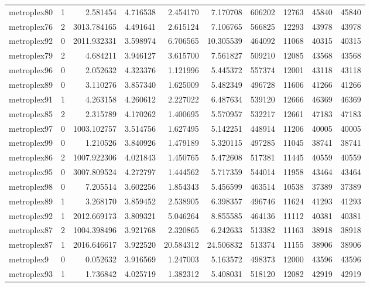 \begin{longtable}{|l|r|r|r|r|r|r|r|r|r|}
metroplex80 & 1 & 2.581454 & 4.716538 & 2.454170 & 7.170708 & 606202 & 12763 & 45840 & 45840 \\
metroplex76 & 2 & 3013.784165 & 4.491641 & 2.615124 & 7.106765 & 566825 & 12293 & 43978 & 43978 \\
metroplex92 & 0 & 2011.932331 & 3.598974 & 6.706565 & 10.305539 & 464092 & 11068 & 40315 & 40315 \\
metroplex79 & 2 & 4.684211 & 3.946127 & 3.615700 & 7.561827 & 509210 & 12085 & 43568 & 43568 \\
metroplex96 & 0 & 2.052632 & 4.323376 & 1.121996 & 5.445372 & 557374 & 12001 & 43118 & 43118 \\
metroplex89 & 0 & 3.110276 & 3.857340 & 1.625009 & 5.482349 & 496728 & 11606 & 41266 & 41266 \\
metroplex91 & 1 & 4.263158 & 4.260612 & 2.227022 & 6.487634 & 539120 & 12666 & 46369 & 46369 \\
metroplex85 & 2 & 2.315789 & 4.170262 & 1.400695 & 5.570957 & 532217 & 12661 & 47183 & 47183 \\
metroplex97 & 0 & 1003.102757 & 3.514756 & 1.627495 & 5.142251 & 448914 & 11206 & 40005 & 40005 \\
metroplex99 & 0 & 1.210526 & 3.840926 & 1.479189 & 5.320115 & 497285 & 11045 & 38741 & 38741 \\
metroplex86 & 2 & 1007.922306 & 4.021843 & 1.450765 & 5.472608 & 517381 & 11445 & 40559 & 40559 \\
metroplex95 & 0 & 3007.809524 & 4.272797 & 1.444562 & 5.717359 & 544014 & 11958 & 43464 & 43464 \\
metroplex98 & 0 & 7.205514 & 3.602256 & 1.854343 & 5.456599 & 463514 & 10538 & 37389 & 37389 \\
metroplex89 & 1 & 3.268170 & 3.859452 & 2.538905 & 6.398357 & 496746 & 11624 & 41293 & 41293 \\
metroplex92 & 1 & 2012.669173 & 3.809321 & 5.046264 & 8.855585 & 464136 & 11112 & 40381 & 40381 \\
metroplex87 & 2 & 1004.398496 & 3.921768 & 2.320865 & 6.242633 & 513382 & 11163 & 38918 & 38918 \\
metroplex87 & 1 & 2016.646617 & 3.922520 & 20.584312 & 24.506832 & 513374 & 11155 & 38906 & 38906 \\
metroplex9 & 0 & 0.052632 & 3.916569 & 1.247003 & 5.163572 & 498373 & 12000 & 43596 & 43596 \\
metroplex93 & 1 & 1.736842 & 4.025719 & 1.382312 & 5.408031 & 518120 & 12082 & 42919 & 42919 \\

\end{longtable}
